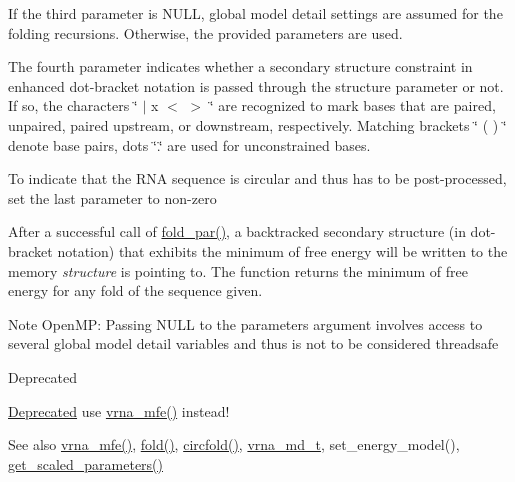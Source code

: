 If the third parameter is N\+U\+LL, global model detail settings are assumed for the folding recursions. Otherwise, the provided parameters are used.

The fourth parameter indicates whether a secondary structure constraint in enhanced dot-\/bracket notation is passed through the structure parameter or not. If so, the characters \char`\"{} $\vert$ x $<$ $>$ \char`\"{} are recognized to mark bases that are paired, unpaired, paired upstream, or downstream, respectively. Matching brackets \char`\"{} ( ) \char`\"{} denote base pairs, dots \char`\"{}.\char`\"{} are used for unconstrained bases.

To indicate that the R\+NA sequence is circular and thus has to be post-\/processed, set the last parameter to non-\/zero

After a successful call of \hyperlink{group__mfe__fold__single_ga2bc41df5d71fee6fd8da9904ee65d8fb}{fold\+\_\+par()}, a backtracked secondary structure (in dot-\/bracket notation) that exhibits the minimum of free energy will be written to the memory {\itshape structure} is pointing to. The function returns the minimum of free energy for any fold of the sequence given.

\begin{DoxyNote}{Note}
Open\+MP\+: Passing N\+U\+LL to the \textquotesingle{}parameters\textquotesingle{} argument involves access to several global model detail variables and thus is not to be considered threadsafe
\end{DoxyNote}
\begin{DoxyRefDesc}{Deprecated}
\item[\hyperlink{deprecated__deprecated000070}{Deprecated}]use \hyperlink{group__mfe__fold_gabd3b147371ccf25c577f88bbbaf159fd}{vrna\+\_\+mfe()} instead!\end{DoxyRefDesc}


\begin{DoxySeeAlso}{See also}
\hyperlink{group__mfe__fold_gabd3b147371ccf25c577f88bbbaf159fd}{vrna\+\_\+mfe()}, \hyperlink{group__mfe__fold__single_gaadafcb0f140795ae62e5ca027e335a9b}{fold()}, \hyperlink{group__mfe__fold__single_ga4ac63ab3e8d9a80ced28b8052d94e423}{circfold()}, \hyperlink{group__model__details_ga1f8a10e12a0a1915f2a4eff0b28ea17c}{vrna\+\_\+md\+\_\+t}, set\+\_\+energy\+\_\+model(), \hyperlink{group__energy__parameters_ga7fa6a000d7c16feab939f2c4ee626197}{get\+\_\+scaled\+\_\+parameters()}
\end{DoxySeeAlso}

